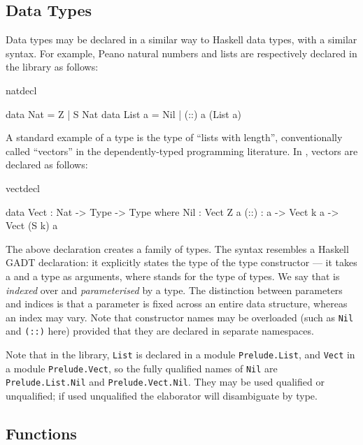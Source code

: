 \subsection{Data Types}

Data types may be declared in a similar way to Haskell data types, with a
similar syntax. For example, Peano natural numbers and lists
are respectively declared in the library as follows:

\begin{SaveVerbatim}{natdecl}

data Nat    = Z   | S Nat 
data List a = Nil | (::) a (List a)

\end{SaveVerbatim}

\noindent
A standard example of a  type is the type of ``lists with
length'', conventionally called ``vectors'' in the dependently-typed
programming literature. In \Idris{}, vectors are declared as follows:

\begin{SaveVerbatim}{vectdecl}

data Vect : Nat -> Type -> Type where
   Nil  : Vect Z a
   (::) : a -> Vect k a -> Vect (S k) a

\end{SaveVerbatim}

\noindent
The above declaration creates a family of types. The syntax resembles a Haskell
GADT declaration: it explicitly states the type
of the type constructor  --- it takes a  and a type as
arguments, where  stands for the type of types. We say that 
is \emph{indexed} over  and \emph{parameterised} by a type. 
The distinction between parameters and indices is that a parameter is fixed
across an entire data structure, whereas an index may vary.
Note that constructor names may be overloaded (such as \texttt{Nil} and
\texttt{(::)} here) provided that they are declared in separate 
namespaces.

Note that in the library, \texttt{List} is declared in a module
\texttt{Prelude.List}, and \texttt{Vect} in a module \texttt{Prelude.Vect}, so
the fully qualified names of \texttt{Nil} are \texttt{Prelude.List.Nil} and
\texttt{Prelude.Vect.Nil}. They may be used qualified or unqualified; if
used unqualified the elaborator will disambiguate by type.

\subsection{Functions}

